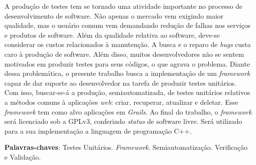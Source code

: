 \begin{resumo}
A produção de testes tem se tornado uma atividade importante no processo de desenvolvimento de software. Não apenas o mercado vem exigindo maior qualidade, mas o usuário comum vem demandando redução de falhas nos serviços e produtos de software. Além da qualidade relativa ao software, deve-se considerar os custos relacionados à manutenção. A busca e o reparo de \textit{bugs} custa caro à produção de software. Além disso, muitos desenvolvedores não se sentem motivados em produzir testes para seus códigos, o que agrava o problema. Diante dessa problemática, o presente trabalho busca a implementação de um \textit{framework} capaz de dar suporte ao desenvolvedor na tarefa de produzir testes unitários. Com isso, buscar-se-á a produção, semiautomatizada, de testes unitários relativos a métodos comuns à aplicações \textit{web}: criar, recuperar, atualizar e deletar. Esse \textit{framework} tem como alvo aplicações em \textit{Grails}. Ao final do trabalho, o \textit{framework} será licenciado sob a GPLv3, conferindo \textit{status} de software livre. Será utilizado para a sua implementação a linguagem de programação C++.
\vspace{\onelineskip}
    
\noindent
\textbf{Palavras-chaves}: Testes Unitários. \textit{Framework}. Semiautomatização. Verificação e Validação.
\end{resumo}
